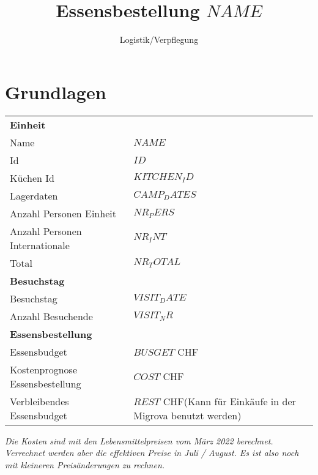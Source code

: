 \documentclass[11pt]{article}
\author{Logistik/Verpflegung}
\title{Essensbestellung $NAME$}
\begin{document}
	\section*{Grundlagen}

		\begin{tabular}{ll}
            \textbf{Einheit}\\
            Name & $NAME$ \\
            Id & $ID$\\
            Küchen Id & $KITCHEN_ID$\\
            Lagerdaten & $CAMP_DATES$ \\
            Anzahl Personen Einheit & $NR_PERS$\\
            Anzahl Personen Internationale & $NR_INT$\\
            Total & $NR_TOTAL$\\
            \textbf{Besuchstag}\\
            Besuchstag & $VISIT_DATE$\\
            Anzahl Besuchende & $VISIT_NR$\\
            \textbf{Essensbestellung}\\
            Essensbudget & $BUSGET$ CHF\\
            Kostenprognose Essensbestellung & $COST$ CHF\\
            Verbleibendes Essensbudget & $REST$ CHF\hspace{1cm}(Kann für Einkäufe in der Migrova benutzt werden)  \\
        \end{tabular}

\vspace{1cm}
\textit{Die Kosten sind mit den Lebensmittelpreisen vom März 2022 berechnet. Verrechnet werden aber die effektiven Preise in Juli / August. Es ist also noch mit kleineren Preisänderungen zu rechnen.}
\color{black}

\newpage
\small
\end{document}
